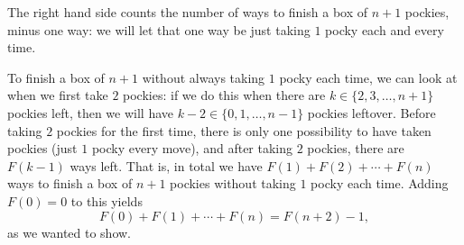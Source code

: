 \documentclass[11pt]{scrartcl}
\begin{document}
\begin{enumerate}[label=\textbf{N\arabic*}.]
\begin{enumerate}
     The right hand side counts the number of ways to finish a box of $n+1$ pockies, minus one way: we will let that one way be just taking $1$ pocky each and every time.
     
     To finish a box of $n+1$ without always taking $1$ pocky each time, we can look at when we first take $2$ pockies: if we do this when there are $k \in \{2, 3, \ldots, n+1\}$ pockies left, then we will have $k-2 \in \{0, 1, \ldots, n-1\}$ pockies leftover. Before taking $2$ pockies for the first time, there is only one possibility to have taken pockies (just $1$ pocky every move), and after taking $2$ pockies, there are $F(k-1)$ ways left. That is, in total we have $F(1) + F(2) + \cdots + F(n)$ ways to finish a box of $n+1$ pockies without taking $1$ pocky each time. Adding $F(0) = 0$ to this yields 
     \[
       F(0) + F(1) + \cdots + F(n) = F(n+2) - 1,
     \]
     as we wanted to show.
    \end{enumerate}
\end{enumerate}
\end{document}
